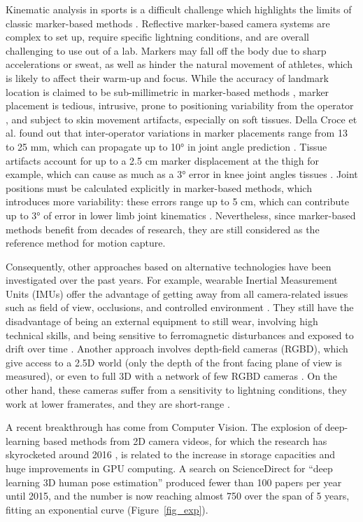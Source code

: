 Kinematic analysis in sports is a difficult challenge which highlights the limits of classic marker-based methods \cite{Mündermann2006}. Reflective marker-based camera systems are complex to set up, require specific lightning conditions, and are overall challenging to use out of a lab. Markers may fall off the body due to sharp accelerations or sweat, as well as hinder the natural movement of athletes, which is likely to affect their warm-up and focus. While the accuracy of landmark location is claimed to be sub-millimetric in marker-based methods \cite{Topley2020}, marker placement is tedious, intrusive, prone to positioning variability from the operator \cite{Tsushima2003}, and subject to skin movement artifacts, especially on soft tissues. Della Croce et al. found out that inter-operator variations in marker placements range from 13 to 25 mm, which can propagate up to 10° in joint angle prediction \cite{Gorton2009,Croce1999}.  Tissue artifacts account for up to a 2.5 cm marker displacement at the thigh for example, which can cause as much as a 3° error in knee joint angles tissues \cite{Benoit2015,Cappozzo1995}. Joint positions must be calculated explicitly in marker-based methods, which introduces more variability: these errors range up to 5 cm, which can contribute up to 3° of error in lower limb joint kinematics \cite{Leboeuf2019}. Nevertheless, since marker-based methods benefit from decades of research, they are still considered as the reference method for motion capture.

Consequently, other approaches based on alternative technologies have been investigated over the past years. For example, wearable Inertial Measurement Units (IMUs) offer the advantage of getting away from all camera-related issues such as field of view, occlusions, and controlled environment \cite{Zhang2013}. They still have the disadvantage of being an external equipment to still wear, involving high technical skills, and being sensitive to ferromagnetic disturbances and exposed to drift over time \cite{Ahmad2013}. Another approach involves depth-field cameras (RGBD), which give access to a 2.5D world (only the depth of the front facing plane of view is measured), or even to full 3D with a network of few RGBD cameras \cite{Carraro2017,Choppin2013,Colombel2020}. On the other hand, these cameras suffer from a sensitivity to lightning conditions, they work at lower framerates, and they are short-range \cite{Han2013}. 

A recent breakthrough has come from Computer Vision. The explosion of deep-learning based methods from 2D camera videos, for which the research has skyrocketed around 2016 \cite{Wang2021a}, is related to the increase in storage capacities and huge improvements in GPU computing. A search on ScienceDirect for “deep learning 3D human pose estimation” produced fewer than 100 papers per year until 2015, and the number is now reaching almost 750 over the span of 5 years, fitting an exponential curve (Figure~\ref{fig_exp}).

